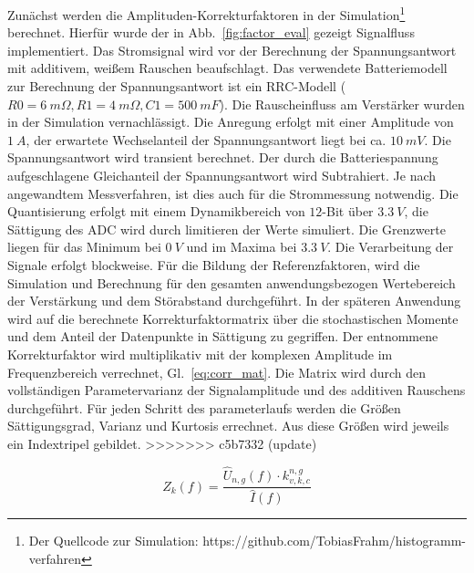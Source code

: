 Zunächst werden die Amplituden-Korrekturfaktoren in der Simulation\footnote[2]{Der Quellcode zur Simulation: https://github.com/TobiasFrahm/histogramm-verfahren} berechnet. Hierfür wurde der in Abb.~\ref{fig:factor_eval} gezeigt Signalfluss implementiert. Das Stromsignal wird vor der Berechnung der Spannungsantwort mit additivem, weißem Rauschen beaufschlagt. Das verwendete Batteriemodell zur Berechnung der Spannungsantwort ist ein RRC-Modell ($R0 = \SI{6}{m\Omega}, R1=\SI{4}{m\Omega}, C1=\SI{500}{mF}$). Die Rauscheinfluss am Verstärker wurden in der Simulation vernachlässigt. Die Anregung erfolgt mit einer Amplitude von $\SI{1}{A}$, der erwartete Wechselanteil der Spannungsantwort liegt bei ca. $\SI{10}{mV}$. Die Spannungsantwort wird transient berechnet. Der durch die Batteriespannung aufgeschlagene Gleichanteil der Spannungsantwort wird Subtrahiert. Je nach angewandtem Messverfahren, ist dies auch für die Strommessung notwendig. Die Quantisierung erfolgt mit einem Dynamikbereich von $12$-Bit über $\SI{3.3}{V}$, die Sättigung des ADC wird durch limitieren der Werte simuliert. Die Grenzwerte liegen für das Minimum bei $\SI{0}{V}$ und im Maxima bei $\SI{3.3}{V}$. Die Verarbeitung der Signale erfolgt blockweise. Für die Bildung der Referenzfaktoren, wird die Simulation und Berechnung für den gesamten anwendungsbezogen Wertebereich der Verstärkung und dem Störabstand durchgeführt. In der späteren Anwendung wird auf die berechnete Korrekturfaktormatrix über die stochastischen Momente und dem Anteil der Datenpunkte in Sättigung zu gegriffen. Der entnommene Korrekturfaktor wird multiplikativ mit der komplexen Amplitude im Frequenzbereich verrechnet, Gl.~\eqref{eq:corr_mat}. Die Matrix wird durch den vollständigen Parametervarianz der Signalamplitude und des additiven Rauschens durchgeführt. Für jeden Schritt des parameterlaufs werden die Größen Sättigungsgrad, Varianz und Kurtosis errechnet. Aus diese Größen wird jeweils ein Indextripel gebildet.
>>>>>>> c5b7332 (update)


\begin{equation}
	\label{eq:corr_mat}
	Z_k(f) = \frac{\hat{U}_{n,g}(f) \cdot k_{v,k,c}^{n,g}}{\hat{I}(f)}
\end{equation}

